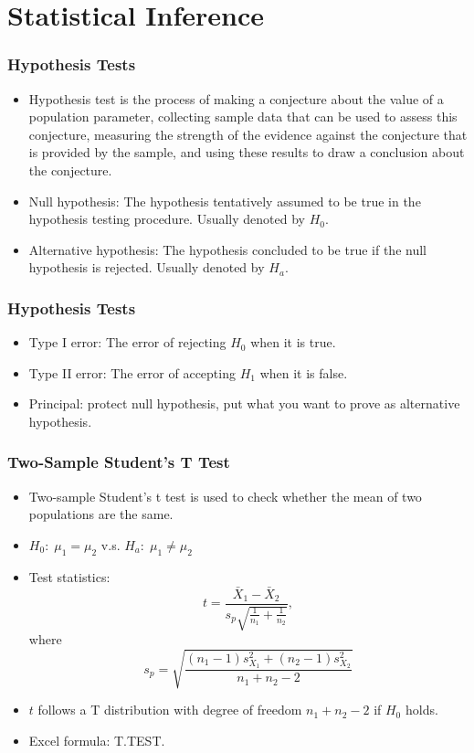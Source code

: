 \documentclass[11pt]{beamer}
\begin{document}
\section{Statistical Inference}

\begin{frame}
\frametitle{Hypothesis Tests}
\begin{itemize}
    \item Hypothesis test is the process of making a conjecture about the value of a population parameter, collecting sample data that can be used to assess this conjecture, measuring the strength of the evidence against the conjecture that is provided by the sample, and using these results to draw a conclusion about the conjecture.
    \item Null hypothesis: The hypothesis tentatively assumed to be true in the hypothesis testing procedure. Usually denoted by $H_0$.
    \item Alternative hypothesis: The hypothesis concluded to be true if the null hypothesis is rejected. Usually denoted by $H_a$.
\end{itemize}
\end{frame}

\begin{frame}
\frametitle{Hypothesis Tests}
\begin{itemize}
    \item Type I error: The error of rejecting $H_0$ when it is true.
    \item Type II error: The error of accepting $H_1$ when it is false.
    \item Principal: protect null hypothesis, put what you want to prove as alternative hypothesis.
\end{itemize}
\end{frame}

\begin{frame}
\frametitle{Two-Sample Student's T Test}
\begin{itemize}
    \item Two-sample Student's t test is used to check whether the mean of two populations are the same.
    \item $H_0: \; \mu_1=\mu_2$ v.s. $H_a: \; \mu_1 \neq \mu_2$
    \item Test statistics: $$t=\frac{\bar{X}_1-\bar{X}_2}{s_p\sqrt{\frac{1}{n_1}+\frac{1}{n_2}}},$$ where 
    $$s_p=\sqrt{\frac{(n_1-1)s^2_{X_1}+(n_2-1)s^2_{X_2}}{n_1+n_2-2}}$$
    \item $t$ follows a T distribution with degree of freedom $n_1+n_2-2$ if $H_0$ holds.
    \item Excel formula: T.TEST.
\end{itemize}
\end{frame}
\end{document}
